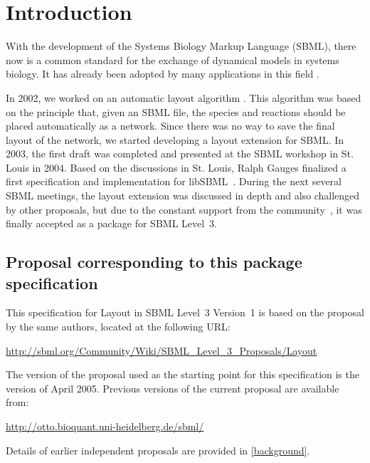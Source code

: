 \section{Introduction}

With the development of the Systems Biology Markup Language (SBML), there now is a common 
standard for the exchange of dynamical models in systems biology. It has already 
been adopted by many applications in this field 
\citep{SBMLWebsite,sbml3core,SBMLArticle}. 

In 2002, we worked on an automatic layout algorithm \citep{Wegner2005}. 
This algorithm was based on the principle that, given an SBML file, the species and reactions should be placed 
automatically as a network. Since there was no way to save the final 
layout of the network, we started developing a layout extension for SBML. In 
2003, the first draft was completed and presented at the SBML workshop in St. 
Louis in 2004. Based on the discussions in St. Louis, Ralph Gauges 
finalized a first specification and implementation for libSBML~\citep{Gauges01082006}.
During the next several SBML meetings, the 
layout extension was discussed in depth and also challenged by other 
proposals, but due to the constant support from the
community~\cite[e.g.,][]{Deckard01122006}, it was finally accepted as
a package for SBML Level~3. 

\subsection{Proposal corresponding to this package specification}

This specification for Layout in SBML Level~3
Version~1 is based on the proposal by the same authors, located at the
following URL:

\begin{center}
  \vspace*{1ex}\small
  \url{http://sbml.org/Community/Wiki/SBML_Level_3_Proposals/Layout}
  \vspace*{1ex}
\end{center}

The
version of the proposal used as the starting point for this
specification is the version of April 2005. Previous versions of the current 
proposal are available from:
\begin{center}
  \url{http://otto.bioquant.uni-heidelberg.de/sbml/}
\end{center}
Details of earlier independent proposals are provided in \ref{background}.

